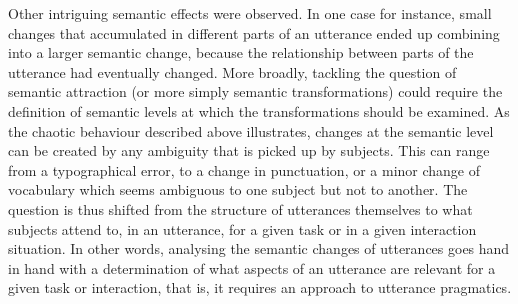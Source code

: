 \documentclass[a4paper,fleqn]{cas-dc}
\begin{document}
Other intriguing semantic effects were observed. In one case for
instance, small changes that accumulated in different parts of an
utterance ended up combining into a larger semantic change, because the
relationship between parts of the utterance had eventually changed. More
broadly, tackling the question of semantic attraction (or more simply
semantic transformations) could require the definition of semantic
levels at which the transformations should be examined. As the chaotic
behaviour described above illustrates, changes at the semantic level can
be created by any ambiguity that is picked up by subjects. This can
range from a typographical error, to a change in punctuation, or a minor
change of vocabulary which seems ambiguous to one subject but not to
another. The question is thus shifted from the structure of utterances
themselves to what subjects attend to, in an utterance, for a given task
or in a given interaction situation. In other words, analysing the
semantic changes of utterances goes hand in hand with a determination of
what aspects of an utterance are relevant for a given task or
interaction, that is, it requires an approach to utterance pragmatics.
\end{document}
